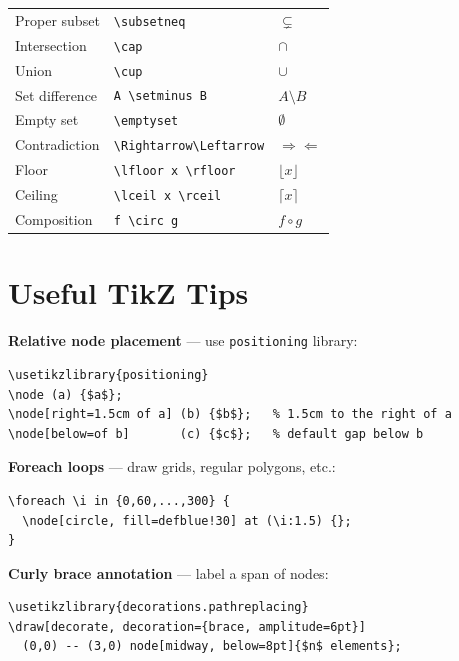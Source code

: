 \documentclass[11pt]{article}
\begin{document}
\begin{center}
\begin{tabular}{l l l}
  Proper subset       & \texttt{\textbackslash{}subsetneq} & $\subsetneq$ \\
  Intersection        & \texttt{\textbackslash{}cap} & $\cap$ \\
  Union               & \texttt{\textbackslash{}cup} & $\cup$ \\
  Set difference      & \texttt{A \textbackslash{}setminus B} & $A \setminus B$ \\
  Empty set           & \texttt{\textbackslash{}emptyset} & $\emptyset$ \\
  Contradiction       & \texttt{\textbackslash{}Rightarrow\textbackslash{}Leftarrow} & $\Rightarrow\Leftarrow$ \\
  Floor               & \texttt{\textbackslash{}lfloor x \textbackslash{}rfloor} & $\lfloor x \rfloor$ \\
  Ceiling             & \texttt{\textbackslash{}lceil x \textbackslash{}rceil} & $\lceil x \rceil$ \\
  Composition         & \texttt{f \textbackslash{}circ g} & $f \circ g$ \\
  \hline
\end{tabular}
\end{center}

\section{Useful TikZ Tips}

\begin{defbox}
\textbf{Relative node placement} — use \texttt{positioning} library:
\begin{lstlisting}
\usetikzlibrary{positioning}
\node (a) {$a$};
\node[right=1.5cm of a] (b) {$b$};   % 1.5cm to the right of a
\node[below=of b]       (c) {$c$};   % default gap below b
\end{lstlisting}
\end{defbox}

\begin{defbox}
\textbf{Foreach loops} — draw grids, regular polygons, etc.:
\begin{lstlisting}
\foreach \i in {0,60,...,300} {
  \node[circle, fill=defblue!30] at (\i:1.5) {};
}
\end{lstlisting}
\end{defbox}

\begin{defbox}
\textbf{Curly brace annotation} — label a span of nodes:
\begin{lstlisting}
\usetikzlibrary{decorations.pathreplacing}
\draw[decorate, decoration={brace, amplitude=6pt}]
  (0,0) -- (3,0) node[midway, below=8pt]{$n$ elements};
\end{lstlisting}
\end{defbox}
\end{document}
